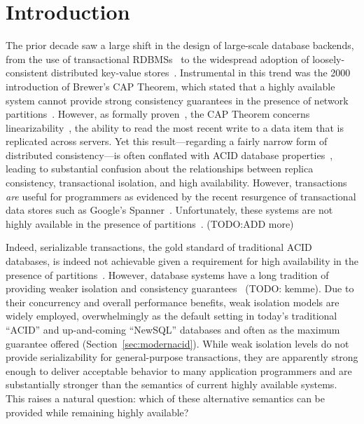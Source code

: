 
\section{Introduction}

The prior decade saw a large shift in the design of large-scale
database backends, from the use of transactional
RDBMSs~\cite{bernstein-book, gray-isolation,
  gray-virtues} to the widespread adoption of loosely-consistent
distributed key-value stores~\cite{bigtable, pnuts,
  dynamo}. Instrumental in this trend was the 2000 introduction of
Brewer's CAP Theorem, which stated that a highly available system
cannot provide strong consistency guarantees in the presence of
network partitions~\cite{brewer-slides}. However, as formally
proven~\cite{gilbert-cap}, the CAP Theorem concerns
linearizability~\cite{herlihy-art}, the ability to read the most
recent write to a data item that is replicated across servers. Yet
this result---regarding a fairly narrow form of distributed
consistency---is often conflated with ACID database
properties~\cite{brewer-slides, hn, foundation-article}, leading to
substantial confusion about the relationships between replica
consistency, transactional isolation, and high availability. However,
transactions \textit{are} useful for programmers as evidenced by the
recent resurgence of transactional data stores such as Google's
Spanner~\cite{spanner}. Unfortunately, these systems are not highly
available in the presence of partitions~\cite{walter, mdcc,
  foundation-article, krikellas-bargain, eiger}. (TODO:ADD more)

Indeed, serializable transactions, the gold standard of traditional
ACID databases, is indeed not achievable given a requirement for high
availability in the presence of
partitions~\cite{davidson-survey}. However, database systems have a
long tradition of providing weaker isolation and consistency
guarantees~\cite{adya, ansicritique, gray-isolation,
  gray-virtues} (TODO: kemme). Due to their concurrency and overall performance
benefits, weak isolation models are widely employed, overwhelmingly as
the default setting in today's traditional ``ACID'' and up-and-coming
``NewSQL'' databases and often as the maximum guarantee offered
(Section~\ref{sec:modernacid}). While weak isolation levels do not
provide serializability for general-purpose transactions, they are
apparently strong enough to deliver acceptable behavior to many
application programmers and are substantially stronger than the
semantics of current highly available systems. This raises a natural
question: which of these alternative semantics can be provided while
remaining highly available?

